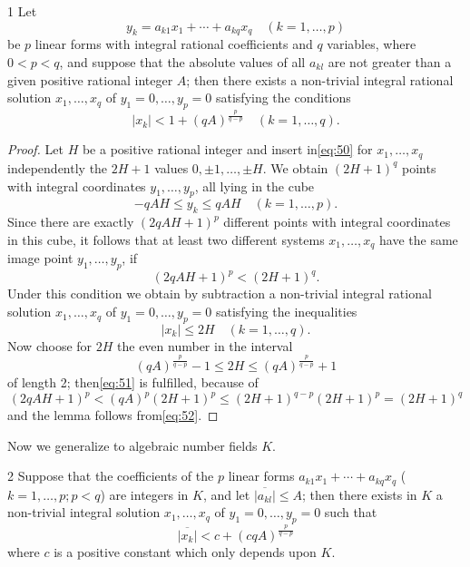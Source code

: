\begin{mylemma}{}{1}
Let
\begin{equation}
y_k = a_{k1}x_1 + \cdots + a_{kq}x_q \quad (k=1,\ldots,p) \tag{50}\label{eq:50}
\end{equation}
be $p$ linear forms with integral rational coefficients and $q$ variables, where $0 < p < q$, and suppose that the absolute values of all $a_{kl}$ are not greater than a given positive rational integer $A$; then there exists a non-trivial integral rational solution $x_1, \ldots, x_q$ of $y_1 = 0, \ldots, y_p = 0$ satisfying the conditions
\[|x_k| < 1 + (qA)^{\frac{p}{q-p}} \quad (k=1,\ldots,q).\]
\end{mylemma}

\begin{proof}
Let $H$ be a positive rational integer and insert in\eqref{eq:50} for $x_1, \ldots, x_q$ independently the $2H+1$ values $0, \pm 1, \ldots, \pm H$. We obtain $(2H+1)^q$ points with integral coordinates $y_1, \ldots, y_p$, all lying in the cube
\[-qAH \le y_k \le qAH \quad (k=1,\ldots,p).\]
Since there are exactly $(2qAH + 1)^p$ different points with integral coordinates in this cube, it follows that at least two different systems $x_1, \dots, x_q$ have the same image point $y_1, \dots, y_p$, if
\begin{equation}
(2qAH+1)^p < (2H+1)^q. \tag{51}\label{eq:51}
\end{equation}
Under this condition we obtain by subtraction a non-trivial integral rational solution $x_1, \dots, x_q$ of $y_1 = 0, \dots, y_p = 0$ satisfying the inequalities
\begin{equation}
|x_k| \le 2H \quad (k=1,\ldots,q). \tag{52}\label{eq:52}
\end{equation}
Now choose for $2H$ the even number in the interval
\[(qA)^{\frac{p}{q-p}} - 1 \le 2H \le (qA)^{\frac{p}{q-p}} + 1\]
of length 2; then\eqref{eq:51} is fulfilled, because of
\[(2qAH+1)^p < (qA)^p (2H+1)^p \le (2H+1)^{q-p}(2H+1)^p = (2H+1)^q\]
and the lemma follows from\eqref{eq:52}.
\end{proof}

Now we generalize to algebraic number fields $K$.

\begin{mylemma}{}{2}
Suppose that the coefficients of the $p$ linear forms $a_{k1}x_1 + \cdots + a_{kq}x_q$ ($k=1, \ldots, p; p < q$) are integers in $K$, and let $\overline{|a_{kl}|} \le A$; then there exists in $K$ a non-trivial integral solution $x_1, \ldots, x_q$ of $y_1 = 0, \ldots, y_p = 0$ such that
\begin{equation}
\overline{|x_k|} < c + (c q A)^{\frac{p}{q-p}} \tag{53}\label{eq:53}
\end{equation}
where $c$ is a positive constant which only depends upon $K$.
\end{mylemma}

